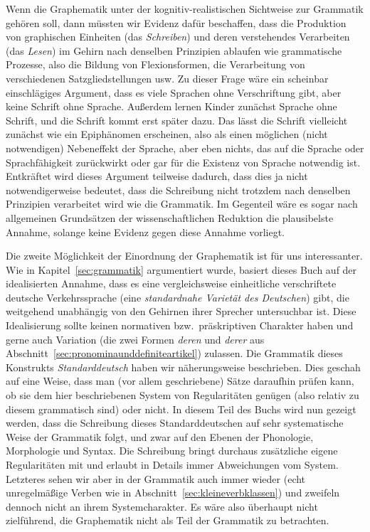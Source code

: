 Wenn die Graphematik unter der kognitiv-realistischen Sichtweise zur Grammatik gehören soll, dann müssten wir Evidenz dafür beschaffen, dass die Produktion von graphischen Einheiten (das \textit{Schreiben}) und deren verstehendes Verarbeiten (das \textit{Lesen}) im Gehirn nach denselben Prinzipien ablaufen wie grammatische Prozesse, also die Bildung von Flexionsformen, die Verarbeitung von verschiedenen Satzgliedstellungen usw.
Zu dieser Frage wäre ein scheinbar einschlägiges Argument, dass es viele Sprachen ohne Verschriftung gibt, aber keine Schrift ohne Sprache.
Außerdem lernen Kinder zunächst Sprache ohne Schrift, und die Schrift kommt erst später dazu.
Das lässt die Schrift vielleicht zunächst wie ein Epiphänomen erscheinen, also als einen möglichen (nicht notwendigen) Nebeneffekt der Sprache, aber eben nichts, das auf die Sprache oder Sprachfähigkeit zurückwirkt oder gar für die Existenz von Sprache notwendig ist.
Entkräftet wird dieses Argument teilweise dadurch, dass dies ja nicht notwendigerweise bedeutet, dass die Schreibung nicht trotzdem nach denselben Prinzipien verarbeitet wird wie die Grammatik.
Im Gegenteil wäre es sogar nach allgemeinen Grundsätzen der wissenschaftlichen Reduktion die plausibelste Annahme, solange keine Evidenz gegen diese Annahme vorliegt.

Die zweite Möglichkeit der Einordnung der Graphematik ist für uns interessanter.
Wie in Kapitel~\ref{sec:grammatik} argumentiert wurde, basiert dieses Buch auf der idealisierten Annahme, dass es eine vergleichsweise einheitliche verschriftete deutsche Verkehrssprache (eine \textit{standardnahe Varietät des Deutschen}) gibt, die weitgehend unabhängig von den Gehirnen ihrer Sprecher untersuchbar ist.
Diese Idealisierung sollte keinen normativen bzw.\ präskriptiven Charakter haben und gerne auch Variation (\zB die zwei Formen \textit{deren} und \textit{derer} aus Abschnitt~\ref{sec:pronominaunddefiniteartikel}) zulassen.
Die Grammatik dieses Konstrukts \textit{Standarddeutsch} haben wir näherungsweise beschrieben.
Dies geschah auf eine Weise, dass man (vor allem geschriebene) Sätze daraufhin prüfen kann, ob sie dem hier beschriebenen System von Regularitäten genügen (also relativ zu diesem grammatisch sind) oder nicht.
In diesem Teil des Buchs wird nun gezeigt werden, dass die Schreibung dieses Standarddeutschen auf sehr systematische Weise der Grammatik folgt, und zwar auf den Ebenen der Phonologie, Morphologie und Syntax.
Die Schreibung bringt durchaus zusätzliche eigene Regularitäten mit und erlaubt in Details immer Abweichungen vom System.
Letzteres sehen wir aber in der Grammatik auch immer wieder (\zB echt unregelmäßige Verben wie in Abschnitt~\ref{sec:kleineverbklassen}) und zweifeln dennoch nicht an ihrem Systemcharakter.
Es wäre also überhaupt nicht zielführend, die Graphematik nicht als Teil der Grammatik zu betrachten.

